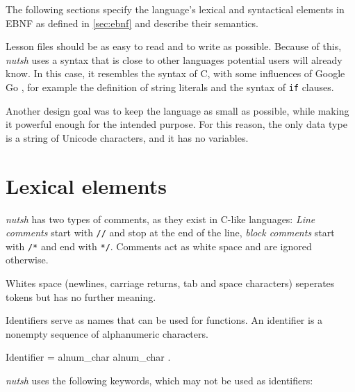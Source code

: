 \documentclass[paper=a4,twoside,abstract=on,cleardoublepage=empty,numbers=noenddot,toc=bib,12pt,appendixprefix=true]{scrreprt}
\begin{document}


The following sections specify the language's lexical and syntactical elements in \textsc{EBNF} as defined in \cref{sec:ebnf} and describe their semantics.

Lesson files should be as easy to read and to write as possible. Because of this, \emph{nutsh} uses a syntax that is close to other languages potential users will already know. In this case, it resembles the syntax of C, with some influences of Google Go \cite{google13}, for example the definition of string literals and the syntax of \texttt{if} clauses.

Another design goal was to keep the language as small as possible, while making it powerful enough for the intended purpose. For this reason, the only data type is a string of Unicode characters, and it has no variables.

\section{Lexical elements}


\emph{nutsh} has two types of comments, as they exist in C-like languages: \emph{Line comments} start with \texttt{//} and stop at the end of the line, \emph{block comments} start with \texttt{/*} and end with \texttt{*/}. Comments act as white space and are ignored otherwise.


Whites space (newlines, carriage returns, tab and space characters) seperates tokens but has no further meaning.


Identifiers serve as names that can be used for functions. An identifier is a nonempty sequence of alphanumeric characters.

\begin{ebnf}
Identifier = alnum_char { alnum_char } .
\end{ebnf}


\emph{nutsh} uses the following keywords, which may not be used as identifiers:
\end{document}
